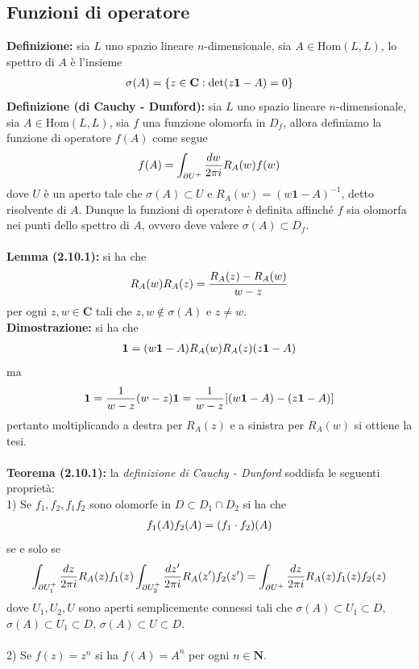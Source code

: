 \documentclass{article}
\begin{document}
\newpage
\subsection{Funzioni di operatore}
\textbf{Definizione:} sia $L$ uno spazio lineare $n$-dimensionale, sia $A \in \mathrm{Hom}(L, L)$, lo spettro di $A$ è l'insieme
\begin{gather}
    \sigma(A) = \{z \in \mathbf{C} : \det(z\mathbf{1} - A) = 0\} \notag
\end{gather}
\textbf{Definizione (di Cauchy - Dunford):} sia $L$ uno spazio lineare $n$-dimensionale, sia $A \in \mathrm{Hom}(L, L)$, sia $f$ una funzione olomorfa in $D_f$, allora definiamo la funzione di operatore $f(A)$ come segue
\begin{gather}
    f(A) = \int_{\partial U^+}\frac{dw}{2\pi i}R_A(w)f(w) \notag
\end{gather}
dove $U$ è un aperto tale che $\sigma(A) \subset U$ e $R_A(w) = (w\mathbf{1} - A)^{-1}$, detto risolvente di $A$. Dunque la funzioni di operatore è definita affinché $f$ sia olomorfa nei punti dello spettro di $A$, ovvero deve valere $\sigma(A) \subset D_f$. \\ \\
\textbf{Lemma (2.10.1):} si ha che
\begin{gather}
    R_A(w)R_A(z) = \frac{R_A(z) - R_A(w)}{w - z} \notag
\end{gather}
per ogni $z, w \in \mathbf{C}$ tali che $z, w \not\in \sigma(A)$ e $z \neq w$. \\

\textbf{Dimostrazione:} si ha che
\begin{align}
    \mathbf{1} = (w\mathbf{1} - A)R_A(w)R_A(z)(z\mathbf{1} - A) \notag
\end{align}
ma
\begin{gather}
    \mathbf{1} = \frac{1}{w - z}(w - z)\mathbf{1} = \frac{1}{w - z}[(w\mathbf{1} - A) - (z\mathbf{1} - A)] \notag
\end{gather}
pertanto moltiplicando a destra per $R_A(z)$ e a sinistra per $R_A(w)$ si ottiene la tesi. \\ \\
\textbf{Teorema (2.10.1):} la \textit{definizione di Cauchy - Dunford} soddisfa le seguenti proprietà: \\
1) Se $f_1, f_2, f_1f_2$ sono olomorfe in $D \subset D_1 \cap D_2$ si ha che
\begin{gather}
    f_1(A)f_2(A) = (f_1 \cdot f_2)(A) \notag
\end{gather}
se e solo se
\begin{gather}
    \int_{\partial U^+_1}\frac{dz}{2\pi i}R_A(z)f_1(z)\int_{\partial U^+_2}\frac{dz'}{2\pi i}R_A(z')f_2(z') = \int_{\partial U^+}\frac{dz}{2\pi i}R_A(z)f_1(z)f_2(z) \notag
\end{gather}
dove $U_1, U_2, U$ sono aperti semplicemente connessi tali che $\sigma(A) \subset U_1 \subset D$, $\sigma(A) \subset U_1 \subset D$, $\sigma(A) \subset U \subset D$. \\ \\
2) Se $f(z) = z^n$ si ha $f(A) = A^n$ per ogni $n \in \mathbf{N}$. \\
\end{document}
